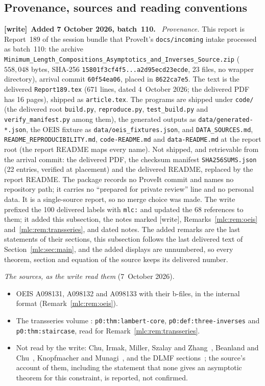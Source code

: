 \documentclass[11pt]{article}
\theoremstyle{remark}\newtheorem{remark}[theorem]{Remark}
\newcommand{\file}[1]{\nolinkurl{#1}}
\newenvironment{writenote}[1][]{\par\smallskip\begingroup\small
 \noindent\textbf{[write]}\if\relax\detokenize{#1}\relax\else~\textbf{#1.}\fi\ }%
 {\par\endgroup\smallskip}
\begin{document}
\subsection{Provenance, sources and reading conventions}\label{mlc:sec:provenance}
\begin{writenote}[Added 7 October 2026, batch~110]
\emph{Provenance.} This report is Report~189 of the session bundle that
ProveIt's \file{docs/incoming} intake processed as batch~110: the archive
\file{Minimum_Length_Compositions_Asymptotics_and_Inverses_Source.zip}
($558{,}048$ bytes, SHA-256 \file{15801f3cf4f5...a2d95ecd23ecde}, 23 files,
no wrapper directory), arrival commit \file{60f54ea06}, placed in
\file{8622ca7e5}. The text is the delivered \file{Report189.tex} (671 lines,
dated 4~October 2026; the delivered PDF has 16 pages), shipped as
\file{article.tex}. The programs are shipped under \file{code/} (the
delivered root \file{build.py}, \file{reproduce.py}, \file{test_build.py}
and \file{verify_manifest.py} among them), the generated outputs as
\file{data/generated-*.json}, the OEIS fixture as
\file{data/oeis_fixtures.json}, and \file{DATA_SOURCES.md},
\file{README_REPRODUCIBILITY.md}, \file{code-README.md} and
\file{data-README.md} at the report root (the report README maps every
name). Not shipped, and retrievable from the arrival commit: the delivered
PDF, the checksum manifest \file{SHA256SUMS.json} (22 entries, verified at
placement) and the delivered README, replaced by the report README. The
package records no ProveIt commit and names no repository path; it carries
no ``prepared for private review'' line and no personal data. It is a
single-source report, so no merge choice was made. The write prefixed the
100 delivered labels with \file{mlc:} and updated the 68 references to them;
it added this subsection, the notes marked [write],
Remarks~\ref{mlc:rem:oeis} and~\ref{mlc:rem:transseries}, and dated notes.
The added remarks are the last statements of their sections, this
subsection follows the last delivered text of Section~\ref{mlc:sec:main},
and the added displays are unnumbered, so every theorem, section and
equation of the source keeps its delivered number.

\emph{The sources, as the write read them} (7~October 2026).
\begin{itemize}\raggedright
\item OEIS A098131, A098132 and A098133 with their b-files, in the internal
 format (Remark~\ref{mlc:rem:oeis}).
\item The transseries volume
 :
 \file{p0:thm:lambert-core}, \file{p0:def:three-inverses} and
 \file{p0:thm:staircase}, read for Remark~\ref{mlc:rem:transseries}.
\item Not read by the write: Chu, Irmak, Miller, Szalay and
 Zhang~\cite{chu}, Beanland and Chu~\cite{beanland}, Knopfmacher and
 Munagi~\cite{smallest}, and the DLMF sections~\cite{dlmfTheta,dlmfBernoulli};
 the source's account of them, including the statement that none gives an
 asymptotic theorem for this constraint, is reported, not confirmed.
\end{itemize}


\end{writenote}
\end{document}
